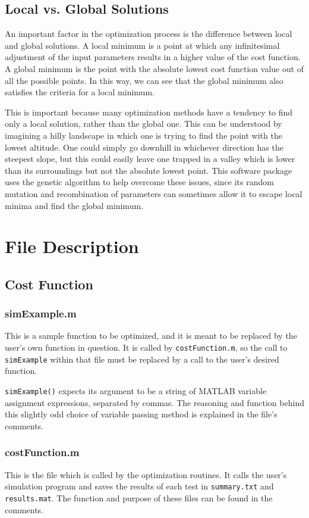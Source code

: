 \documentclass[]{article}
\begin{document}
\subsection{Local vs. Global Solutions}
An important factor in the optimization process is the difference between local and global solutions. A local minimum is a point at which any infinitesimal adjustment of the input parameters results in a higher value of the cost function. A global minimum is the point with the absolute lowest cost function value out of all the possible points. In this way, we can see that the global minimum also satisfies the criteria for a local minimum.

This is important because many optimization methods have a tendency to find only a local solution, rather than the global one. This can be understood by imagining a hilly landscape in which one is trying to find the point with the lowest altitude. One could simply go downhill in whichever direction has the steepest slope, but this could easily leave one trapped in a valley which is lower than its surroundings but not the absolute lowest point. This software package uses the genetic algorithm to help overcome these issues, since its random mutation and recombination of parameters can sometimes allow it to escape local minima and find the global minimum. 
\section{File Description}
\subsection{Cost Function}
\subsubsection{simExample.m}
This is a sample function to be optimized, and it is meant to be replaced by the user's own function in question. It is called by \texttt{costFunction.m}, so the call to \texttt{simExample} within that file must be replaced by a call to the user's desired function. 

\texttt{simExample()} expects its argument to be a string of MATLAB variable assignment expressions, separated by commas. The reasoning and function behind this slightly odd choice of variable passing method is explained in the file's comments. 
\subsubsection{costFunction.m}
This is the file which is called by the optimization routines. It calls the user's simulation program and saves the results of each test in \texttt{summary.txt} and \texttt{results.mat}. The function and purpose of these files can be found in the comments.
\end{document}
